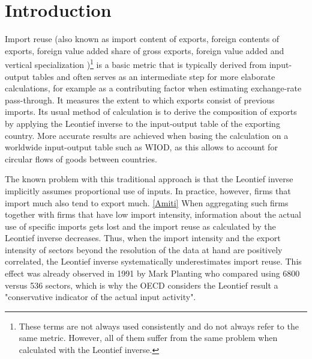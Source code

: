 \documentclass[english]{uzhpub}
\begin{document}
\section{Introduction}
Import reuse (also known as import content of exports, foreign contents of exports, foreign value added share of gross exports, foreign value added and vertical specialization \cite{hummels2001nature})\footnote{These terms are not always used consistently and do not always refer to the same metric. However, all of them suffer from the same problem when calculated with the Leontief inverse.} is a basic metric that is typically derived from input-output tables and often serves as an intermediate step for more elaborate calculations, for example as a contributing factor when estimating exchange-rate pass-through. It measures the extent to which exports consist of previous imports. Its usual method of calculation is to derive the composition of exports by applying the Leontief inverse to the input-output table of the exporting country. More accurate results are achieved when basing the calculation on a worldwide input-output table such as WIOD, as this allows to account for circular flows of goods between countries. \citep{auer2016international}

The known problem with this traditional approach is that the Leontief inverse implicitly assumes proportional use of inputs. In practice, however, firms that import much also tend to export much. \ref{Amiti} When aggregating such firms together with firms that have low import intensity, information about the actual use of specific imports gets lost and the import reuse as calculated by the Leontief inverse decreases. Thus, when the import intensity and the export intensity of sectors beyond the resolution of the data at hand are positively correlated, the Leontief inverse systematically underestimates import reuse. This effect was already observed in 1991 by Mark Planting who compared using 6800 versus 536 sectors, which is why the OECD considers the Leontief result a "conservative indicator of the actual input activity". \citep{oecd2000}
\end{document}
